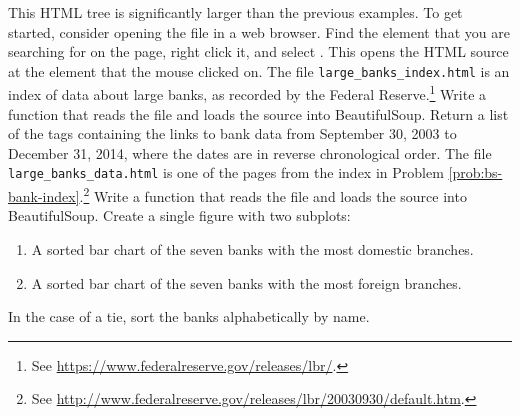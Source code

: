 This HTML tree is significantly larger than the previous examples.
To get started, consider opening the file in a web browser.
Find the element that you are searching for on the page, right click it, and select .
This opens the HTML source at the element that the mouse clicked on.
The file \texttt{large\_banks\_index.html} is an index of data about large banks, as recorded by the Federal Reserve.\footnote{See \url{https://www.federalreserve.gov/releases/lbr/}.}
Write a function that reads the file and loads the source into BeautifulSoup.
Return a list of the tags containing the links to bank data from September 30, 2003 to December 31, 2014, where the dates are in reverse chronological order.
\label{prob:bs-bank-index}
The file \texttt{large\_banks\_data.html} is one of the pages from the index in Problem \ref{prob:bs-bank-index}.\footnote{See \url{http://www.federalreserve.gov/releases/lbr/20030930/default.htm}.}
Write a function that reads the file and loads the source into BeautifulSoup.
Create a single figure with two subplots:
\begin{enumerate}
    \item A sorted bar chart of the seven banks with the most domestic branches.
    \item A sorted bar chart of the seven banks with the most foreign branches.
\end{enumerate}
In the case of a tie, sort the banks alphabetically by name.
